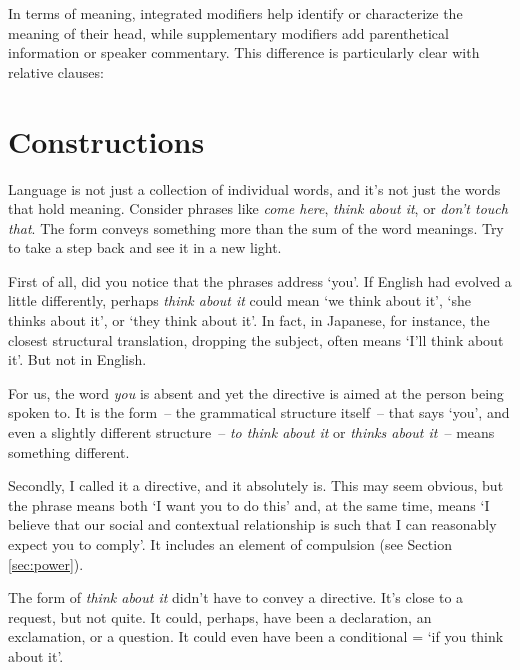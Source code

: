 In terms of meaning, integrated modifiers help identify or characterize the meaning of their head, while supplementary modifiers add parenthetical information or speaker commentary. This difference is particularly clear with relative clauses:

\ea\label{ex:relative-contrast}
    \z
\z{}

\section{Constructions}\label{sec:constructions}
Language is not just a collection of individual words, and it's not just the words that hold meaning. Consider phrases like \textit{come here}, \textit{think about it}, or \textit{don't touch that}. The form conveys something more than the sum of the word meanings. Try to take a step back and see it in a new light.

First of all, did you notice that the phrases address `you'. If English had evolved a little differently, perhaps \textit{think about it} could mean `we think about it', `she thinks about it', or `they think about it'. In fact, in Japanese, for instance, the closest structural translation, dropping the subject, often means `I'll think about it'. But not in English.

For us, the word \textit{you} is absent and yet the directive is aimed at the person being spoken to. It is the form~-- the grammatical structure itself~-- that says `you', and even a slightly different structure~-- \textit{to think about it} or \textit{thinks about it}~-- means something different.

Secondly, I called it a directive, and it absolutely is. This may seem obvious, but the phrase means both `I want you to do this' and, at the same time, means `I believe that our social and contextual relationship is such that I can reasonably expect you to comply'. It includes an element of compulsion (see Section \ref{sec:power}).

The form of \textit{think about it} didn't have to convey a directive. It's close to a request, but not quite. It could, perhaps, have been a declaration, an exclamation, or a question. It could even have been a conditional = `if you think about it'.

